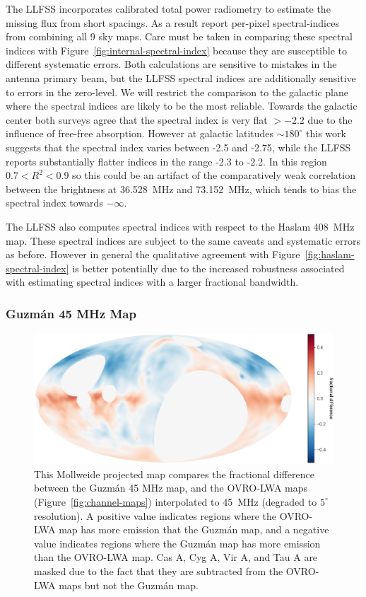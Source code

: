 \documentclass[twocolumn]{aastex61}
\begin{document}
The LLFSS incorporates calibrated total power radiometry to estimate the missing flux from short
spacings. As a result \citet{2017MNRAS.469.4537D} report per-pixel spectral-indices from combining
all 9 sky maps. Care must be taken in comparing these spectral indices with
Figure~\ref{fig:internal-spectral-index} because they are susceptible to different systematic
errors. Both calculations are sensitive to mistakes in the antenna primary beam, but the LLFSS
spectral indices are additionally sensitive to errors in the zero-level. We will restrict the
comparison to the galactic plane where the spectral indices are likely to be the most reliable.
Towards the galactic center both surveys agree that the spectral index is very flat $>-2.2$ due to
the influence of free-free absorption.  However at galactic latitudes $\sim 180^\circ$ this work
suggests that the spectral index varies between -2.5 and -2.75, while the LLFSS reports
substantially flatter indices in the range -2.3 to -2.2. In this region $0.7 < R^2 < 0.9$ so this
could be an artifact of the comparatively weak correlation between the brightness at 36.528~MHz and
73.152~MHz, which tends to bias the spectral index towards $-\infty$.

The LLFSS also computes spectral indices with respect to the Haslam 408~MHz map. These spectral
indices are subject to the same caveats and systematic errors as before. However in general the
qualitative agreement with Figure~\ref{fig:haslam-spectral-index} is better potentially due to the
increased robustness associated with estimating spectral indices with a larger fractional bandwidth.

\subsubsection{Guzm\'{a}n 45 MHz Map}

\begin{figure}[t]
    \centering
    \includegraphics[height=0.32\textheight]{figures/guzman/guzman}
    \caption{
        This Mollweide projected map compares the fractional difference between the Guzm\'{a}n 45
        MHz map, and the OVRO-LWA maps (Figure~\ref{fig:channel-maps}) interpolated to 45~MHz
        (degraded to $5^\circ$ resolution). A positive value indicates regions where the OVRO-LWA
        map has more emission that the Guzm\'{a}n map, and a negative value indicates regions where
        the Guzm\'{a}n map has more emission than the OVRO-LWA map. Cas A, Cyg A, Vir A, and Tau A
        are masked due to the fact that they are subtracted from the OVRO-LWA maps but not the
        Guzm\'{a}n map.
    }
    \label{fig:guzman-comparison}
\end{figure}
\end{document}
